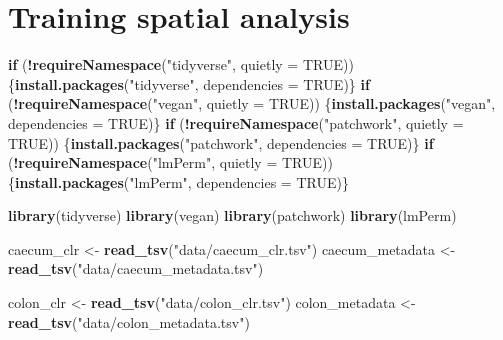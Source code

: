 \documentclass[
]{article}
\author{}
\date{\vspace{-2.5em}}
\newenvironment{Shaded}{\begin{snugshade}}{\end{snugshade}}
\newcommand{\AttributeTok}[1]{\textcolor[rgb]{0.13,0.29,0.53}{#1}}
\newcommand{\ConstantTok}[1]{\textcolor[rgb]{0.56,0.35,0.01}{#1}}
\newcommand{\ControlFlowTok}[1]{\textcolor[rgb]{0.13,0.29,0.53}{\textbf{#1}}}
\newcommand{\FunctionTok}[1]{\textcolor[rgb]{0.13,0.29,0.53}{\textbf{#1}}}
\newcommand{\NormalTok}[1]{#1}
\newcommand{\OtherTok}[1]{\textcolor[rgb]{0.56,0.35,0.01}{#1}}
\newcommand{\SpecialCharTok}[1]{\textcolor[rgb]{0.81,0.36,0.00}{\textbf{#1}}}
\newcommand{\StringTok}[1]{\textcolor[rgb]{0.31,0.60,0.02}{#1}}
\begin{document}
\section{Training spatial analysis}\label{training-spatial-analysis}

\begin{Shaded}
\begin{Highlighting}[]
\ControlFlowTok{if}\NormalTok{ (}\SpecialCharTok{!}\FunctionTok{requireNamespace}\NormalTok{(}\StringTok{"tidyverse"}\NormalTok{, }\AttributeTok{quietly =} \ConstantTok{TRUE}\NormalTok{)) \{}\FunctionTok{install.packages}\NormalTok{(}\StringTok{"tidyverse"}\NormalTok{, }\AttributeTok{dependencies =} \ConstantTok{TRUE}\NormalTok{)\}}
\ControlFlowTok{if}\NormalTok{ (}\SpecialCharTok{!}\FunctionTok{requireNamespace}\NormalTok{(}\StringTok{"vegan"}\NormalTok{, }\AttributeTok{quietly =} \ConstantTok{TRUE}\NormalTok{)) \{}\FunctionTok{install.packages}\NormalTok{(}\StringTok{"vegan"}\NormalTok{, }\AttributeTok{dependencies =} \ConstantTok{TRUE}\NormalTok{)\}}
\ControlFlowTok{if}\NormalTok{ (}\SpecialCharTok{!}\FunctionTok{requireNamespace}\NormalTok{(}\StringTok{"patchwork"}\NormalTok{, }\AttributeTok{quietly =} \ConstantTok{TRUE}\NormalTok{)) \{}\FunctionTok{install.packages}\NormalTok{(}\StringTok{"patchwork"}\NormalTok{, }\AttributeTok{dependencies =} \ConstantTok{TRUE}\NormalTok{)\}}
\ControlFlowTok{if}\NormalTok{ (}\SpecialCharTok{!}\FunctionTok{requireNamespace}\NormalTok{(}\StringTok{"lmPerm"}\NormalTok{, }\AttributeTok{quietly =} \ConstantTok{TRUE}\NormalTok{)) \{}\FunctionTok{install.packages}\NormalTok{(}\StringTok{"lmPerm"}\NormalTok{, }\AttributeTok{dependencies =} \ConstantTok{TRUE}\NormalTok{)\}}
\end{Highlighting}
\end{Shaded}

\begin{Shaded}
\begin{Highlighting}[]
\FunctionTok{library}\NormalTok{(tidyverse)}
\FunctionTok{library}\NormalTok{(vegan)}
\FunctionTok{library}\NormalTok{(patchwork)}
\FunctionTok{library}\NormalTok{(lmPerm)}
\end{Highlighting}
\end{Shaded}

\begin{Shaded}
\begin{Highlighting}[]
\NormalTok{caecum\_clr }\OtherTok{\textless{}{-}} \FunctionTok{read\_tsv}\NormalTok{(}\StringTok{"data/caecum\_clr.tsv"}\NormalTok{)}
\NormalTok{caecum\_metadata }\OtherTok{\textless{}{-}} \FunctionTok{read\_tsv}\NormalTok{(}\StringTok{"data/caecum\_metadata.tsv"}\NormalTok{)}

\NormalTok{colon\_clr }\OtherTok{\textless{}{-}} \FunctionTok{read\_tsv}\NormalTok{(}\StringTok{"data/colon\_clr.tsv"}\NormalTok{)}
\NormalTok{colon\_metadata }\OtherTok{\textless{}{-}} \FunctionTok{read\_tsv}\NormalTok{(}\StringTok{"data/colon\_metadata.tsv"}\NormalTok{)}
\end{Highlighting}
\end{Shaded}
\end{document}
